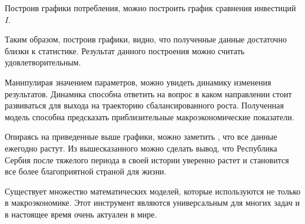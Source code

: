 \begin{center}
\end{center}

Построив графики потребления, можно построить график сравнения инвестиций $I$.

\begin{center}
\end{center}

Таким образом, построив графики, видно, что полученные данные достаточно близки к статистике.
Результат данного построения можно считать удовлетворительным.

Манипулирая значением параметров, можно увидеть динамику изменения результатов.
Динамика способна ответить на вопрос в каком направлении стоит развиваться для выхода на траекторию сбалансированного роста.
Полученная модель способна предсказать приблизительные макроэкономические показатели.

Опираясь на приведенные выше графики, можно заметить , что все данные ежегодно растут.
Из вышесказанного можно сделать вывод, что Республика Сербия после тяжелого периода в своей истории уверенно растет и становится все более благоприятной страной для жизни.

Существует множество математических моделей, которые используются не только в макроэкономике.
Этот инструмент являются универсальным для многих задач и в настоящее время очень актуален в мире.


